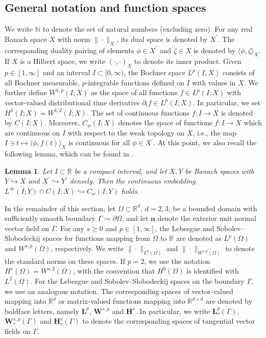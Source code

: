\documentclass[11pt,reqno]{amsart}
\newtheorem{lemma}[theorem]{Lemma}
\theoremstyle{remark}
\numberwithin{equation}{section}
\newcommand{\norm}[1]{\| #1 \|}
\newcommand{\ang}[2]{ \langle #1 , #2  \rangle}
\newcommand{\scp}[2]{ \left( #1 , #2  \right)}
\newcommand{\R}{\mathbb R}
\newcommand{\N}{\mathbb N}
\newcommand{\n}{\mathbf{n}}
\newcommand{\delt}{\partial_{t}}
\newcommand{\emb}{\hookrightarrow}
\newcommand{\Om}{\Omega}
\newcommand{\Ga}{\Gamma}
\begin{document}
\subsection{General notation and function spaces}

We write $\N$ to denote the set of natural numbers (excluding zero). For any real Banach space $X$ with norm $\norm{\cdot}_X$, its dual space is denoted by $X^\prime$. The corresponding duality pairing of elements $\phi\in X^\prime$ and $\zeta\in X$ is denoted by $\ang{\phi}{\zeta}_X$. If $X$ is a Hilbert space, we write $\scp{\cdot}{\cdot}_X$ to denote its inner product. Given $p\in[1,\infty]$ and an interval $I\subset[0,\infty)$, the Bochner space $L^p(I,X)$ consists of all Bochner measurable, $p$-integrable functions defined on $I$ with values in $X$. We further define $W^{1,p}(I;X)$ as the space of all functions $f\in L^p(I;X)$ with vector-valued distributional time derivative $\delt f\in L^p(I;X)$. In particular, we set $H^1(I;X) = W^{1,2}(I;X)$. The set of continuous functions $f:I\rightarrow X$ is denoted by $C(I;X)$. Moreover, $C_w(I;X)$ denotes the space of functions $f:I\to X$ which are continuous on $I$ with respect to the weak topology on $X$, i.e., the map $I\ni t\mapsto \ang{\phi}{f(t)}_X$ is continuous for all $\phi\in X^\prime$. 
At this point, we also recall the following lemma, which can be found in \cite[Lemma~4.1]{Abels2009}.
\begin{lemma}\label{Prelim:Lemma:BC_w}
    Let $I\subset\R$ be a compact interval, and let $X,Y$ be Banach spaces with $Y\emb X$ and $X^\prime\emb Y^\prime$ densely. Then the continuous embedding $L^\infty(I;Y)\cap C(I;X)\emb C_w(I;Y)$ holds.
\end{lemma}

In the remainder of this section, let $\Om\subset\R^d$, $d=2,3$, be a bounded domain with sufficiently smooth boundary $\Ga\coloneqq\partial\Om$, and let $\n$ denote the exterior unit normal vector field on $\Gamma$. For any $s\geq 0$ and $p\in[1,\infty]$, the Lebesgue and Sobolev–Slobodeckij spaces for functions mapping from $\Om$ to $\R$ are denoted as $L^p(\Om)$ and $W^{s,p}(\Om)$, respectively. We write $\norm{\cdot}_{L^p(\Om)}$ and $\norm{\cdot}_{W^{s,p}(\Om)}$ to denote the standard norms on these spaces. If $p = 2$, we use the notation $H^s(\Om) = W^{s,2}(\Om)$, with the convention that $H^0(\Om)$ is identified with $L^2(\Om)$. For the Lebesgue and Sobolev–Slobodeckij spaces on the boundary $\Ga$, we use an analogous notation. The corresponding spaces of vector-valued mapping into $\R^d$ or matrix-valued functions mapping into $\R^{d\times d}$ are denoted by boldface letters, namely $\mathbf L^p$, $\mathbf W^{s,p}$ and $\mathbf H^s$. In particular, we write $\mathbf L^p_\tau(\Gamma)$, $\mathbf W^{s,p}_\tau(\Gamma)$ and $\mathbf H^s_\tau(\Gamma)$ to denote the corresponding spaces of tangential vector fields on $\Gamma$.
\end{document}
